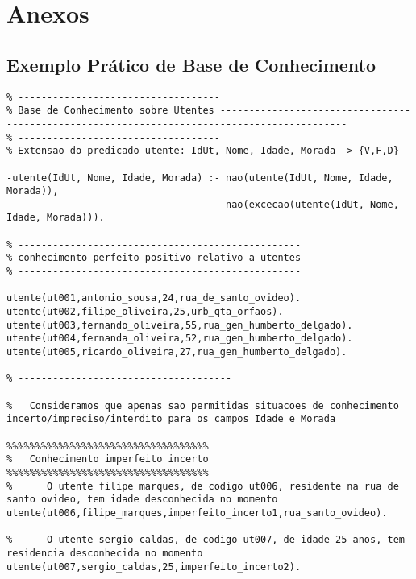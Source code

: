 \documentclass[
  oneside,
  10pt, a4paper,
  footinclude=true,
  headinclude=true,
  cleardoublepage=empty
]{scrbook}
\begin{document}
			
%	


	
	
		\chapter{Anexos}


\section{Exemplo Prático de Base de Conhecimento}
	\label{base_conhecimento_anexo}
	\begin{lstlisting}	
% -----------------------------------
% Base de Conhecimento sobre Utentes --------------------------------------------------------------------------------------------
% -----------------------------------
% Extensao do predicado utente: IdUt, Nome, Idade, Morada -> {V,F,D}

-utente(IdUt, Nome, Idade, Morada) :- nao(utente(IdUt, Nome, Idade, Morada)),
                                      nao(excecao(utente(IdUt, Nome, Idade, Morada))).

% -------------------------------------------------
% conhecimento perfeito positivo relativo a utentes
% -------------------------------------------------

utente(ut001,antonio_sousa,24,rua_de_santo_ovideo).
utente(ut002,filipe_oliveira,25,urb_qta_orfaos).
utente(ut003,fernando_oliveira,55,rua_gen_humberto_delgado).
utente(ut004,fernanda_oliveira,52,rua_gen_humberto_delgado).
utente(ut005,ricardo_oliveira,27,rua_gen_humberto_delgado).

% -------------------------------------

%   Consideramos que apenas sao permitidas situacoes de conhecimento incerto/impreciso/interdito para os campos Idade e Morada

%%%%%%%%%%%%%%%%%%%%%%%%%%%%%%%%%%%
%   Conhecimento imperfeito incerto
%%%%%%%%%%%%%%%%%%%%%%%%%%%%%%%%%%%
%      O utente filipe marques, de codigo ut006, residente na rua de santo ovideo, tem idade desconhecida no momento
utente(ut006,filipe_marques,imperfeito_incerto1,rua_santo_ovideo).

%      O utente sergio caldas, de codigo ut007, de idade 25 anos, tem residencia desconhecida no momento
utente(ut007,sergio_caldas,25,imperfeito_incerto2).


\end{lstlisting}
\end{document}
